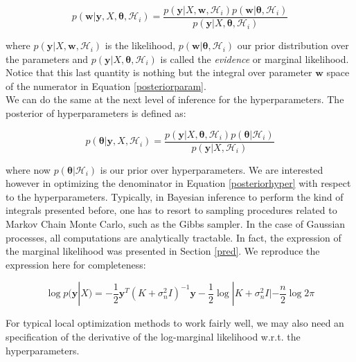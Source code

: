\documentclass[10pt,a4paper,twoside]{book}
\begin{document}
\begin{equation}
\label{posteriorparam}
p(\boldsymbol{w}|\boldsymbol{y}, X, \boldsymbol{\theta}, \mathcal{H}_i) = \dfrac{p(\boldsymbol{y}|X, \boldsymbol{w}, \mathcal{H}_i)p(\boldsymbol{w}|\boldsymbol{\theta}, \mathcal{H}_i)}{p(\boldsymbol{y}|X, \boldsymbol{\theta}, \mathcal{H}_i)}
\end{equation}

where $p(\boldsymbol{y}|X, \boldsymbol{w}, \mathcal{H}_i)$ is the likelihood, $p(\boldsymbol{w}|\boldsymbol{\theta}, \mathcal{H}_i)$ our prior distribution over the parameters and $p(\boldsymbol{y}|X, \boldsymbol{\theta}, \mathcal{H}_i)$ is called the \textit{evidence} or marginal likelihood. Notice that this last quantity is nothing but the integral over parameter $\boldsymbol{w}$ space of the numerator in Equation \ref{posteriorparam}.\\

We can do the same at the next level of inference for the hyperparameters. The posterior of hyperparameters is defined as:

\begin{equation}
\label{posteriorhyper}
p(\boldsymbol{\theta}|\boldsymbol{y}, X, \mathcal{H}_i) = \dfrac{p(\boldsymbol{y}|X, \boldsymbol{\theta}, \mathcal{H}_i)p(\boldsymbol{\theta}|\mathcal{H}_i)}{p(\boldsymbol{y}|X, \mathcal{H}_i)}
\end{equation}

where now $p(\boldsymbol{\theta}|\mathcal{H}_i)$ is our prior over hyperparameters. We are interested however in optimizing the denominator in Equation \ref{posteriorhyper} with respect to the hyperparameters. Typically, in Bayesian inference to perform the kind of integrals presented before, one has to resort to sampling procedures related to Markov Chain Monte Carlo, such as the Gibbs sampler. In the case of Gaussian processes, all computations are analytically tractable. In fact, the expression of the marginal likelihood was presented in Section \ref{pred}. We reproduce the expression here for completeness:

\begin{equation}
\log p(\boldsymbol{y}|X) = - \dfrac{1}{2}\boldsymbol{y}^T(K + \sigma^2_n I)^{-1}\boldsymbol{y} - \dfrac{1}{2}\log |K + \sigma^2_n I| - \dfrac{n}{2}\log 2\pi
\end{equation}

For typical local optimization methods to work fairly well, we may also need an specification of the derivative of the log-marginal likelihood w.r.t. the hyperparameters.
\end{document}
